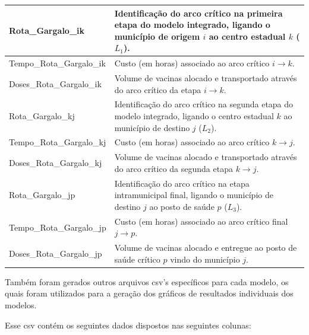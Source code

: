 \begin{longtable}{|l|p{8.5cm}|}
Rota\_Gargalo\_ik & Identificação do arco crítico na primeira etapa do modelo integrado, ligando o município de origem $i$ ao centro estadual $k$ ($L_1$). \\ \hline
Tempo\_Rota\_Gargalo\_ik & Custo (em horas) associado ao arco crítico $i \to k$. \\ \hline
Doses\_Rota\_Gargalo\_ik & Volume de vacinas alocado e transportado através do arco crítico da etapa $i \to k$. \\ \hline
Rota\_Gargalo\_kj & Identificação do arco crítico na segunda etapa do modelo integrado, ligando o centro estadual $k$ ao município de destino $j$ ($L_2$). \\ \hline
Tempo\_Rota\_Gargalo\_kj & Custo (em horas) associado ao arco crítico $k \to j$. \\ \hline
Doses\_Rota\_Gargalo\_kj & Volume de vacinas alocado e transportado através do arco crítico da segunda etapa $k \to j$. \\ \hline
Rota\_Gargalo\_jp & Identificação do arco crítico na etapa intramunicipal final, ligando o município de destino $j$ ao posto de saúde $p$ ($L_3$). \\ \hline
Tempo\_Rota\_Gargalo\_jp & Custo (em horas) associado ao arco crítico final $j \to p$. \\ \hline
Doses\_Rota\_Gargalo\_jp & Volume de vacinas alocado e entregue ao posto de saúde crítico $p$ vindo do município $j$. \\ \hline
\end{longtable}

Também foram gerados outros arquivos csv's específicos para cada modelo, os quais foram utilizados para a geração dos gráficos de resultados individuais dos modelos.

Esse csv contém os seguintes dados dispostos nas seguintes colunas:

